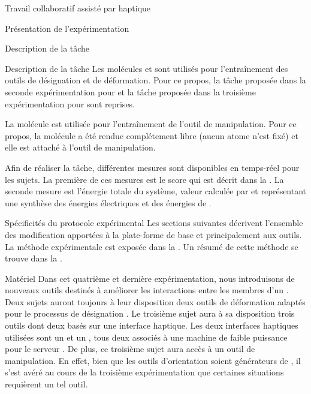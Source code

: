 \documentclass[myfrancais]{mythesis}
\begin{document}
\begin{mychapter}{Travail collaboratif assisté par haptique}
\begin{mysection}{Présentation de l'expérimentation}
\begin{mysubsection}{Description de la tâche}
\begin{mysubsubsection}{Description de la tâche}
					Les molécules \myTRPCAGE et \myPrion sont utilisés pour l'entraînement des outils de désignation et de déformation.
					Pour ce propos, la tâche proposée dans la seconde expérimentation pour \myTRPCAGE et la tâche proposée dans la troisième expérimentation pour \myPrion sont reprises.

					La molécule \myTRPZIPPER est utilisée pour l'entraînement de l'outil de manipulation.
					Pour ce propos, la molécule \myTRPZIPPER a été rendue complétement libre (aucun atome n'est fixé) et elle est attaché à l'outil de manipulation.

					Afin de réaliser la tâche, différentes mesures sont disponibles en temps-réel pour les sujets.
					La première de ces mesures est le score  qui est décrit dans la .
					La seconde mesure est l'énergie totale du système, valeur calculée par  et représentant une synthèse des énergies électriques et des énergies de .
				\end{mysubsubsection}
			\end{mysubsection}
			\begin{mysubsection}{Spécificités du protocole expérimental}
				Les sections suivantes décrivent l'ensemble des modification apportées à la plate-forme de base  et principalement aux outils.
				La méthode expérimentale est exposée dans la .
				Un résumé de cette méthode se trouve dans la .
				\begin{mysubsubsection}[sss-exp4-Materiel]{Matériel}
					Dans cet quatrième et dernière expérimentation, nous introduisons de nouveaux outils destinés à améliorer les interactions entre les membres d'un .
					Deux sujets auront toujours à leur disposition deux outils de déformation adaptés pour le processus de désignation .
					Le troisième sujet aura à sa disposition trois outils dont deux basés sur une interface haptique.
					Les deux interfaces haptiques utilisées sont un \myOmni et un \myDesktop, tous deux associés à une machine de faible puissance pour le serveur .
					De plus, ce troisième sujet aura accès à un outil de manipulation.
					En effet, bien que les outils d'orientation soient générateurs de , il s'est avéré au cours de la troisième expérimentation que certaines situations requièrent un tel outil.

\end{mysubsubsection}
\end{mysubsection}
\end{mysection}
\end{mychapter}
\end{document}
